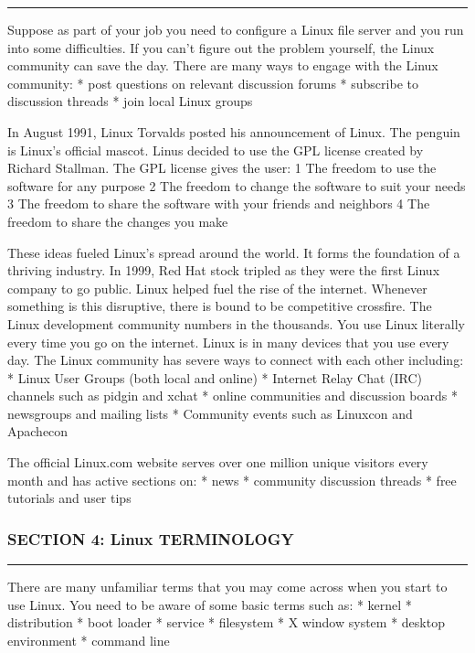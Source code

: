 \begin{center}\rule{3in}{0.4pt}\end{center}

Suppose as part of your job you need to configure a Linux file server
and you run into some difficulties. If you can't figure out the problem
yourself, the Linux community can save the day. There are many ways to
engage with the Linux community: * post questions on relevant discussion
forums * subscribe to discussion threads * join local Linux groups

In August 1991, Linux Torvalds posted his announcement of Linux. The
penguin is Linux's official mascot. Linus decided to use the GPL license
created by Richard Stallman. The GPL license gives the user: 1 The
freedom to use the software for any purpose 2 The freedom to change the
software to suit your needs 3 The freedom to share the software with
your friends and neighbors 4 The freedom to share the changes you make

These ideas fueled Linux's spread around the world. It forms the
foundation of a thriving industry. In 1999, Red Hat stock tripled as
they were the first Linux company to go public. Linux helped fuel the
rise of the internet. Whenever something is this disruptive, there is
bound to be competitive crossfire. The Linux development community
numbers in the thousands. You use Linux literally every time you go on
the internet. Linux is in many devices that you use every day. The Linux
community has severe ways to connect with each other including: * Linux
User Groups (both local and online) * Internet Relay Chat (IRC) channels
such as pidgin and xchat * online communities and discussion boards *
newsgroups and mailing lists * Community events such as Linuxcon and
Apachecon

The official Linux.com website serves over one million unique visitors
every month and has active sections on: * news * community discussion
threads * free tutorials and user tips

\subsubsection{SECTION 4: Linux
TERMINOLOGY}\label{section-4-linux-terminology}

\begin{center}\rule{3in}{0.4pt}\end{center}

There are many unfamiliar terms that you may come across when you start
to use Linux. You need to be aware of some basic terms such as: * kernel
* distribution * boot loader * service * filesystem * X window system *
desktop environment * command line

